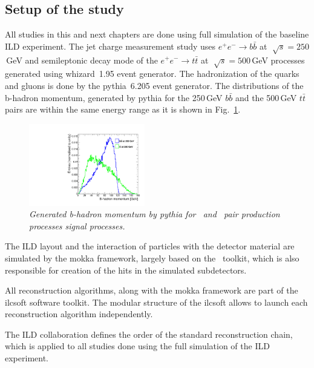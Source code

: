 \subsection{Setup of the study}

All studies in this and next chapters are done using full simulation of the baseline ILD experiment. 
The jet charge measurement study uses $e^+e^- \to b\bar{b}$ at $\sqrt[]{s} = 250$\,GeV and semileptonic decay mode of the $e^+e^- \to t\bar{t}$ at $\sqrt[]{s} = 500$\,GeV processes generated using {\sc whizard}~1.95 event generator. 
The hadronization of the quarks and gluons is done by the {\sc pythia}~6.205 event generator.
The distributions of the b-hadron momentum, generated by {\sc pythia} for the 250\,GeV $b\bar{b}$ and the 500\,GeV $t\bar{t}$ pairs are within the same energy range as it is shown in Fig.~\ref{fig:GenHadronMomentum_3}. 

\begin{figure}[h]
	{\centering
		\includegraphics[width=0.45\textwidth]{ILD/plots/gen-hadron-momentum.pdf}
		\caption{\sl Generated b-hadron momentum by {\sc pythia} for \bbbar\ and \ttbar\ pair production processes signal processes.}
		\label{fig:GenHadronMomentum_3}
	}
\end{figure}


The ILD layout and the interaction of particles with the detector material are simulated by the {\sc mokka} framework, largely based on the \geant\ toolkit, which is also responsible for creation of the hits in the simulated subdetectors. 

All reconstruction algorithms, along with the {\sc mokka} framework are part of the {\sc ilcsoft} software toolkit.
The modular structure of the {\sc ilcsoft} allows to  launch each reconstruction algorithm independently. 

The ILD collaboration defines the order of the standard reconstruction chain, which is applied to all studies done using the full simulation of the ILD experiment. 


